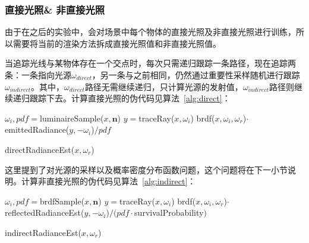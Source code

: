 \subsubsection {直接光照\& 非直接光照}
由于在之后的实验中，会对场景中每个物体的直接光照及非直接光照进行训练，所以需要将当前的渲染方法拆成直接光照值和非直接光照值。

当追踪光线与某物体存在一个交点时，每次只需递归跟踪一条路径，现在追踪两条：一条指向光源$\omega_{direct}$，另一条与之前相同，仍然通过重要性采样随机进行跟踪$\omega_{indirect}$。其中，$\omega_{direct}$路径无需继续递归，只计算光源的发射值，$\omega_{indirect}$路径则继续递归跟踪下去。计算直接光照的伪代码见算法~\ref{alg:direct}：
\begin{algorithm}
\begin{algorithmic}
    \STATE $\omega_{i},pdf=$luminaireSample($x,\bm{n}$)
    \STATE $y=$traceRay($x,\omega_{i}$)
    \RETURN brdf($x,\omega_{i},\omega_{r}$)$\cdot$emittedRadiance($y,-\omega_{i}$)$/pdf$
\end{algorithmic}
\caption{directRadianceEst($x,\omega_{r}$)}
\label{alg:direct}
\end{algorithm}
这里提到了对光源的采样以及概率密度分布函数问题，这个问题将在下一小节说明。计算非直接光照的伪代码见算法~\ref{alg:indirect}：
\begin{algorithm}
\begin{algorithmic}
        \STATE $\omega_{i},pdf=$brdfSample($x,\bm{n}$)
        \STATE $y=$traceRay($x,\omega_{i}$)
        \RETURN brdf($x,\omega_{i},\omega_{r}$)$\cdot$reflectedRadianceEst($y,-\omega_{i}$)$/(pdf\cdot$survivalProbability$)$
    \ELSE
    \ENDIF
\end{algorithmic}
\caption{indirectRadianceEst($x,\omega_{r}$)}
\label{alg:indirect}
\end{algorithm}
 